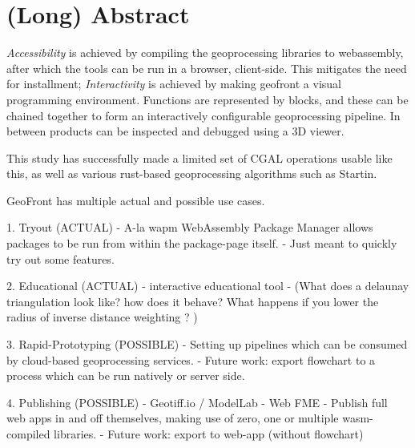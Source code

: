 
\chapter*{ (Long) Abstract }



\emph{Accessibility} is achieved by compiling the geoprocessing libraries to webassembly, after which the tools can be run in a browser, client-side. 
This mitigates the need for installment; 
\emph{Interactivity} is achieved by making geofront a visual programming environment. 
Functions are represented by blocks, and these can be chained together to form an interactively configurable geoprocessing pipeline. 
In between products can be inspected and debugged using a 3D viewer. 

This study has successfully made a limited set of CGAL operations usable like this, as well as various rust-based geoprocessing algorithms such as Startin.

GeoFront has multiple actual and possible use cases. 

1. Tryout (ACTUAL)
   - A-la wapm WebAssembly Package Manager allows packages to be run from within the package-page itself. 
  - Just meant to quickly try out some features.

2. Educational (ACTUAL)
   - interactive educational tool
   - (What does a delaunay triangulation look like? how does it behave? What happens if you lower the radius of inverse distance weighting ? )

3. Rapid-Prototyping (POSSIBLE)
   - Setting up pipelines which can be consumed by cloud-based geoprocessing services. 
   - Future work: export flowchart to a process which can be run natively or server side.

4. Publishing (POSSIBLE)
   - Geotiff.io / ModelLab
   - Web FME 
   - Publish full web apps in and off themselves, making use of zero, one or multiple wasm-compiled libraries.  
   - Future work: export to web-app (without flowchart)






